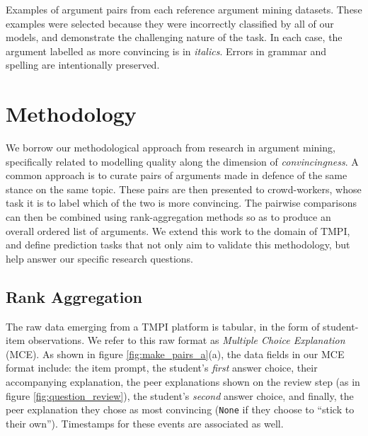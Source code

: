 \documentclass[notitlepage,12pt]{jedm}
\begin{document}
\begin{table}[H]
	\caption{
		Examples of argument pairs from each reference argument mining 
		datasets. 
		These examples were selected because they were incorrectly classified 
		by all of our models, and demonstrate the challenging nature of the 
		task. 
		In each case, the argument labelled as more convincing is in 
		\textit{italics}.
		Errors in grammar and spelling are intentionally preserved.
	}
	\label{tab:sample_obs}
	\begin{subtable}[t]{\textwidth}
		
	\end{subtable}
	\begin{subtable}[t]{\textwidth}
		
	\end{subtable}
\end{table}


\section{Methodology}\label{sec:methodology}

We borrow our methodological approach from research in argument mining, 
specifically related to modelling quality along the dimension of 
\textit{convincingness}.
A common approach is to curate pairs of arguments made in defence of the same 
stance on the same topic.
These pairs are then presented to crowd-workers, whose task it is to label 
which of the two is more convincing. 
The pairwise comparisons can then be combined using rank-aggregation 
methods so as to produce an overall ordered list of arguments.
We extend this work to the domain of TMPI, and define prediction tasks that not 
only aim to validate this methodology, but help answer our specific research 
questions.

\subsection{Rank Aggregation}\label{sec:rank_agg}
The raw data emerging from a TMPI platform is tabular, in the form of 
student-item observations.
We refer to this raw format as \textit{Multiple Choice Explanation} (MCE).
As shown in figure \ref{fig:make_pairs_a}(a), the data fields in our MCE format 
include: the item prompt, the student's \textit{first} answer choice, their 
accompanying explanation, the peer explanations shown on the review step (as in 
figure \ref{fig:question_review}), the student's \textit{second} answer choice, 
and finally, the peer explanation they chose as most convincing (\verb|None| if 
they choose to ``stick to their own'').
Timestamps for these events are associated as well.
\end{document}
